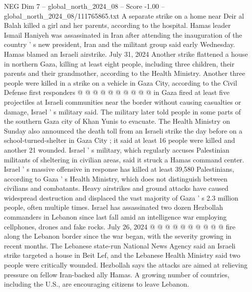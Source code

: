 \begin{textsample}{NEG Dim 7 – global\_north\_2024\_08 – Score -1.00 – global\_north\_2024\_08/111765865.txt}
A separate strike on a home near Deir al Balah killed a girl and her parents, according to the hospital.
Hamas leader Ismail Haniyeh was assassinated in Iran after attending the inauguration of the country ' s new president, Iran and the militant group said early Wednesday.
Hamas blamed an Israeli airstrike.
July 31, 2024 Another strike flattened a house in northern Gaza, killing at least eight people, including three children, their parents and their grandmother, according to the Health Ministry.
Another three people were killed in a strike on a vehicle in Gaza City, according to the Civil Defense first responders @ @ @ @ @ @ @ @ @ @ in Gaza fired at least five projectiles at Israeli communities near the border without causing casualties or damage, Israel ' s military said.
The military later told people in some parts of the southern Gaza city of Khan Yunis to evacuate.
The Health Ministry on Sunday also announced the death toll from an Israeli strike the day before on a school-turned-shelter in Gaza City ; it said at least 16 people were killed and another 21 wounded.
Israel ' s military, which regularly accuses Palestinian militants of sheltering in civilian areas, said it struck a Hamas command center.
Israel ' s massive offensive in response has killed at least 39,580 Palestinians, according to Gaza ' s Health Ministry, which does not distinguish between civilians and combatants.
Heavy airstrikes and ground attacks have caused widespread destruction and displaced the vast majority of Gaza ' s 2.3 million people, often multiple times.
Israel has assassinated two dozen Hezbollah commanders in Lebanon since last fall amid an intelligence war employing cellphones, drones and fake rocks.
July 26, 2024 @ @ @ @ @ @ @ @ @ @ fire along the Lebanon border since the war began, with the severity growing in recent months.
The Lebanese state-run National News Agency said an Israeli strike targeted a house in Beit Lef, and the Lebanese Health Ministry said two people were critically wounded.
Hezbollah says the attacks are aimed at relieving pressure on fellow Iran-backed ally Hamas.
A growing number of countries, including the U.S., are encouraging citizens to leave Lebanon.

\end{textsample}
